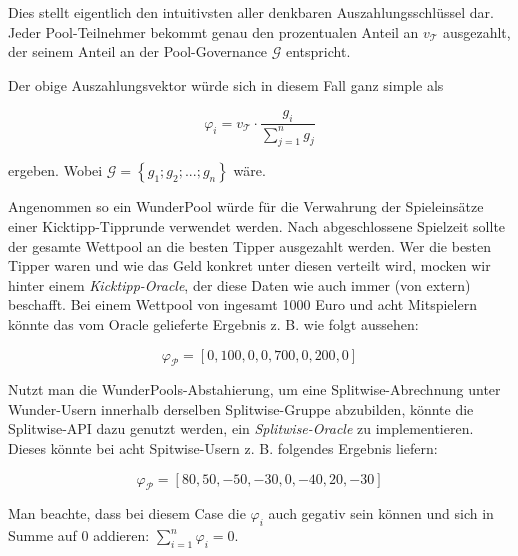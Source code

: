 \begin{Example}

Dies stellt eigentlich den intuitivsten aller denkbaren Auszahlungsschlüssel dar. Jeder Pool-Teilnehmer bekommt genau den prozentualen Anteil an $v_{\mathcal{T}}$ ausgezahlt, der seinem Anteil an der Pool-Governance $\mathcal{G}$ entspricht.

\vspace{0.2cm}

Der obige Auszahlungsvektor würde sich in diesem Fall ganz simple als

\begin{equation*}
  \varphi_i = v_{\mathcal{T}} \cdot \frac{g_i}{\sum_{j=1}^{n} g_j}
\end{equation*}

ergeben. Wobei $\mathcal{G} = \left\{ g_1; g_2;...;g_n \right\}$ wäre.

\end{Example}

\vspace{0.2cm}


\begin{Example}

Angenommen so ein WunderPool würde für die Verwahrung der Spieleinsätze einer Kicktipp-Tipprunde verwendet werden. Nach abgeschlossene Spielzeit sollte der gesamte Wettpool an die besten Tipper ausgezahlt werden. Wer die besten Tipper waren und wie das Geld konkret unter diesen verteilt wird, mocken wir hinter einem \textit{Kicktipp-Oracle}, der diese Daten wie auch immer (von extern) beschafft. Bei einem Wettpool von ingesamt 1000 Euro und acht Mitspielern könnte das vom Oracle gelieferte Ergebnis z. B. wie folgt aussehen:

\begin{equation*}
  \varphi_{\mathcal{P}} = [0, 100, 0, 0, 700, 0, 200, 0]
\end{equation*}

\end{Example}

\vspace{0.2cm}

\begin{Example}

Nutzt man die WunderPools-Abstahierung, um eine Splitwise-Abrechnung unter Wunder-Usern innerhalb derselben Splitwise-Gruppe abzubilden, könnte die Splitwise-API dazu genutzt werden, ein \textit{Splitwise-Oracle} zu implementieren. Dieses könnte bei acht Spitwise-Usern z. B. folgendes Ergebnis liefern:

\begin{equation*}
  \varphi_{\mathcal{P}} = [80, 50, -50, -30, 0, -40, 20, -30]
\end{equation*}

Man beachte, dass bei diesem Case die $\varphi_i$ auch gegativ sein können und sich in Summe auf 0 addieren: $\sum_{i=1}^n \varphi_i = 0$.

\end{Example}

